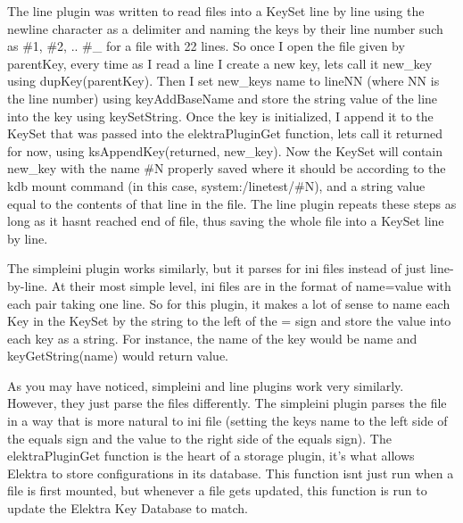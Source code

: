 The line plugin was written to read files into a {\ttfamily Key\+Set} line by line using the newline character as a delimiter and naming the keys by their line number such as {\ttfamily \#1}, {\ttfamily \#2}, .. {\ttfamily \#\+\_} for a file with 22 lines. So once I open the file given by {\ttfamily parent\+Key}, every time as I read a line I create a new key, let\textquotesingle{}s call it {\ttfamily new\+\_\+key} using {\ttfamily dup\+Key(parent\+Key)}. Then I set {\ttfamily new\+\_\+key}\textquotesingle{}s name to {\ttfamily line\+NN} (where NN is the line number) using {\ttfamily key\+Add\+Base\+Name} and store the string value of the line into the key using {\ttfamily key\+Set\+String}. Once the key is initialized, I append it to the {\ttfamily Key\+Set} that was passed into the {\ttfamily elektra\+Plugin\+Get} function, let\textquotesingle{}s call it {\ttfamily returned} for now, using {\ttfamily ks\+Append\+Key(returned, new\+\_\+key)}. Now the {\ttfamily Key\+Set} will contain {\ttfamily new\+\_\+key} with the name {\ttfamily \#N} properly saved where it should be according to the {\ttfamily kdb mount} command (in this case, {\ttfamily system\+:/linetest/\#N}), and a string value equal to the contents of that line in the file. The line plugin repeats these steps as long as it hasn\textquotesingle{}t reached end of file, thus saving the whole file into a {\ttfamily Key\+Set} line by line.

The {\ttfamily simpleini} plugin works similarly, but it parses for {\ttfamily ini} files instead of just line-\/by-\/line. At their most simple level, {\ttfamily ini} files are in the format of {\ttfamily name=value} with each pair taking one line. So for this plugin, it makes a lot of sense to name each {\ttfamily Key} in the {\ttfamily Key\+Set} by the string to the left of the {\ttfamily =} sign and store the value into each key as a string. For instance, the name of the key would be {\ttfamily name} and {\ttfamily key\+Get\+String(name)} would return {\ttfamily value}.

As you may have noticed, {\ttfamily simpleini} and line plugins work very similarly. However, they just parse the files differently. The {\ttfamily simpleini} plugin parses the file in a way that is more natural to {\ttfamily ini} file (setting the key\textquotesingle{}s name to the left side of the equals sign and the value to the right side of the equals sign). The {\ttfamily elektra\+Plugin\+Get} function is the heart of a storage plugin, it’s what allows Elektra to store configurations in its database. This function isn\textquotesingle{}t just run when a file is first mounted, but whenever a file gets updated, this function is run to update the Elektra Key Database to match.

